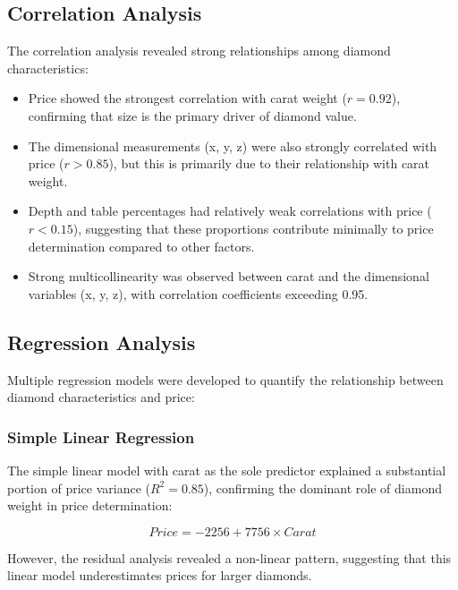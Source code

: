 \documentclass[11pt,a4paper]{article}
\begin{document}
\subsection{Correlation Analysis}

The correlation analysis revealed strong relationships among diamond characteristics:

\begin{itemize}
    \item Price showed the strongest correlation with carat weight ($r = 0.92$), confirming that size is the primary driver of diamond value.
    \item The dimensional measurements (x, y, z) were also strongly correlated with price ($r > 0.85$), but this is primarily due to their relationship with carat weight.
    \item Depth and table percentages had relatively weak correlations with price ($r < 0.15$), suggesting that these proportions contribute minimally to price determination compared to other factors.
    \item Strong multicollinearity was observed between carat and the dimensional variables (x, y, z), with correlation coefficients exceeding 0.95.
\end{itemize}

\subsection{Regression Analysis}

Multiple regression models were developed to quantify the relationship between diamond characteristics and price:

\subsubsection{Simple Linear Regression}

The simple linear model with carat as the sole predictor explained a substantial portion of price variance ($R^2 = 0.85$), confirming the dominant role of diamond weight in price determination:

\begin{equation}
Price = -2256 + 7756 \times Carat
\end{equation}

However, the residual analysis revealed a non-linear pattern, suggesting that this linear model underestimates prices for larger diamonds.
\end{document}
